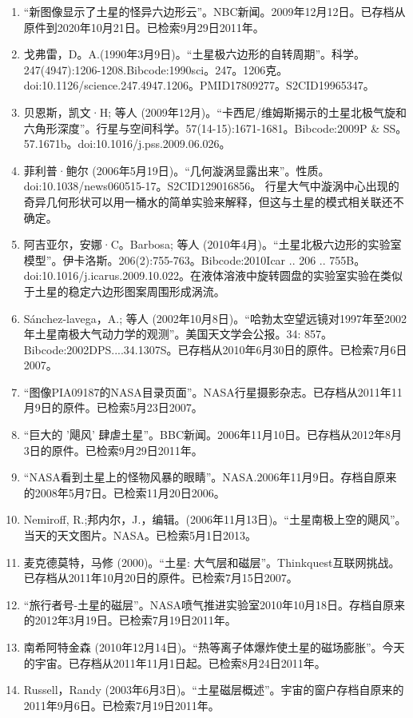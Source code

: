 \begin{enumerate}
\item “新图像显示了土星的怪异六边形云”。NBC新闻。2009年12月12日。已存档从原件到2020年10月21日。已检索9月29日2011年。
\item 戈弗雷，D。A.(1990年3月9日)。“土星极六边形的自转周期”。科学。247(4947):1206-1208.Bibcode:1990sci。247。1206克。doi:10.1126/science.247.4947.1206。PMID17809277。S2CID19965347。  
\item 贝恩斯，凯文·H; 等人 (2009年12月)。“卡西尼/维姆斯揭示的土星北极气旋和六角形深度”。行星与空间科学。57(14-15):1671-1681。Bibcode:2009P & SS。57.1671b。doi:10.1016/j.pss.2009.06.026。
\item 菲利普·鲍尔 (2006年5月19日)。“几何漩涡显露出来”。性质。doi:10.1038/news060515-17。S2CID129016856。 行星大气中漩涡中心出现的奇异几何形状可以用一桶水的简单实验来解释，但这与土星的模式相关联还不确定。
\item 阿吉亚尔，安娜·C。Barbosa; 等人 (2010年4月)。“土星北极六边形的实验室模型”。伊卡洛斯。206(2):755-763。Bibcode:2010Icar .. 206 .. 755B。doi:10.1016/j.icarus.2009.10.022。在液体溶液中旋转圆盘的实验室实验在类似于土星的稳定六边形图案周围形成涡流。
\item Sánchez-lavega，A.; 等人 (2002年10月8日)。“哈勃太空望远镜对1997年至2002年土星南极大气动力学的观测”。美国天文学会公报。34: 857。Bibcode:2002DPS....34.1307S。已存档从2010年6月30日的原件。已检索7月6日2007。
\item “图像PIA09187的NASA目录页面”。NASA行星摄影杂志。已存档从2011年11月9日的原件。已检索5月23日2007。
\item “巨大的 '飓风' 肆虐土星”。BBC新闻。2006年11月10日。已存档从2012年8月3日的原件。已检索9月29日2011年。
\item “NASA看到土星上的怪物风暴的眼睛”。NASA.2006年11月9日。存档自原来的2008年5月7日。已检索11月20日2006。
\item Nemiroff, R.;邦内尔，J.，编辑。(2006年11月13日)。“土星南极上空的飓风”。当天的天文图片。NASA。已检索5月1日2013。
\item 麦克德莫特，马修 (2000)。“土星: 大气层和磁层”。Thinkquest互联网挑战。已存档从2011年10月20日的原件。已检索7月15日2007。
\item “旅行者号-土星的磁层”。NASA喷气推进实验室2010年10月18日。存档自原来的2012年3月19日。已检索7月19日2011年。
\item 南希阿特金森 (2010年12月14日)。“热等离子体爆炸使土星的磁场膨胀”。今天的宇宙。已存档从2011年11月1日起。已检索8月24日2011年。
\item Russell，Randy (2003年6月3日)。“土星磁层概述”。宇宙的窗户存档自原来的2011年9月6日。已检索7月19日2011年。

\end{enumerate}
